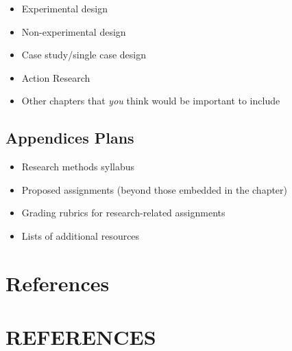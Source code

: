 \documentclass[
  11pt,
]{book}
\providecommand{\tightlist}{%
  \setlength{\itemsep}{0pt}\setlength{\parskip}{0pt}}
\begin{document}
\begin{itemize}
\tightlist
\item
  Experimental design
\item
  Non-experimental design
\item
  Case study/single case design
\item
  Action Research
\item
  Other chapters that \emph{you} think would be important to include
\end{itemize}

\section{Appendices Plans}\label{appendices-plans}

\begin{itemize}
\tightlist
\item
  Research methods syllabus
\item
  Proposed assignments (beyond those embedded in the chapter)
\item
  Grading rubrics for research-related assignments
\item
  Lists of additional resources
\end{itemize}

\chapter{References}\label{references-2}

\chapter*{REFERENCES}\label{references-3}


  
\end{document}
